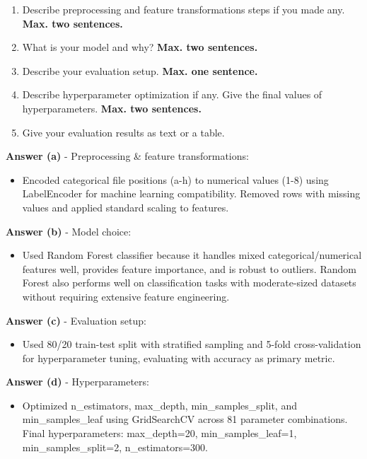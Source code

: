 \documentclass[a4paper,10pt]{article}
\begin{document}
\begin{enumerate}[topsep=0mm, partopsep=0mm, leftmargin=*]
{\begin{enumerate}
\item Describe preprocessing and feature transformations steps if you made any. {\color{red}\textbf{Max. two sentences.}}
\item What is your model and why? {\color{red}\textbf{Max. two sentences.}}
\item Describe your evaluation setup. {\color{red}\textbf{Max. one sentence.}}
\item Describe hyperparameter optimization if any. Give the final values of hyperparameters. {\color{red}\textbf{Max. two sentences.}}
\item Give your evaluation results as text or a table.
\end{enumerate}
}

\textbf{Answer (a)} -  Preprocessing \& feature transformations:
\begin{itemize}
	\item Encoded categorical file positions (a-h) to numerical values (1-8) using LabelEncoder for machine learning compatibility. Removed rows with missing values and applied standard scaling to features.
\end{itemize}

\textbf{Answer (b)} - Model choice:
\begin{itemize}
	\item Used Random Forest classifier because it handles mixed categorical/numerical features well, provides feature importance, and is robust to outliers. Random Forest also performs well on classification tasks with moderate-sized datasets without requiring extensive feature engineering.
\end{itemize}

\textbf{Answer (c)} - Evaluation setup:
\begin{itemize}
	\item Used 80/20 train-test split with stratified sampling and 5-fold cross-validation for hyperparameter tuning, evaluating with accuracy as primary metric.
\end{itemize}

\textbf{Answer (d)} - Hyperparameters:
\begin{itemize}
	\item Optimized n\_estimators, max\_depth, min\_samples\_split, and min\_samples\_leaf using GridSearchCV across 81 parameter combinations. Final hyperparameters: max\_depth=20, min\_samples\_leaf=1, min\_samples\_split=2, n\_estimators=300.
\end{itemize}


\end{enumerate}
\end{document}

